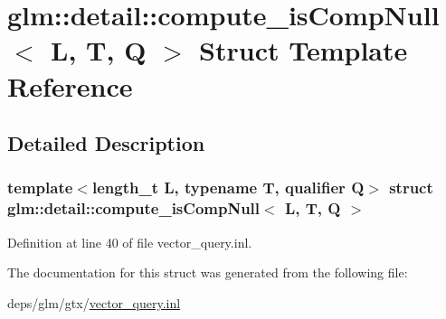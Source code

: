 \hypertarget{structglm_1_1detail_1_1compute__isCompNull}{}\section{glm\+:\+:detail\+:\+:compute\+\_\+is\+Comp\+Null$<$ L, T, Q $>$ Struct Template Reference}
\label{structglm_1_1detail_1_1compute__isCompNull}


\subsection{Detailed Description}
\subsubsection*{template$<$length\+\_\+t L, typename T, qualifier Q$>$\newline
struct glm\+::detail\+::compute\+\_\+is\+Comp\+Null$<$ L, T, Q $>$}



Definition at line 40 of file vector\+\_\+query.\+inl.



The documentation for this struct was generated from the following file\+:\begin{DoxyCompactItemize}
\item 
deps/glm/gtx/\hyperlink{vector__query_8inl}{vector\+\_\+query.\+inl}\end{DoxyCompactItemize}
